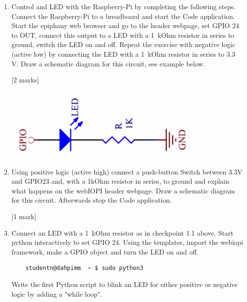 \begin{enumerate}
\item [1.1.] Control and LED with the Raspberry-Pi by completing the following steps. Connect the Raspberry-Pi to a breadboard and start the \webIOPi Code application.
Start the epiphany web browser and %
go to the \webIOPi header webpage, set GPIO 24 to OUT, connect this output to a LED with a 1~kOhm resistor in series to ground, switch the LED on and off.  Repeat the exercise with negative logic (active low) by connecting the LED with a 1~kOhm resistor in series to 3.3 V.  Draw a schematic diagram for this circuit, see example below.  

\hfill [2 marks]
 \vspace*{-8mm}
 \begin{center}                                        
 {\includegraphics[width=10cm]{figs/ActiveHighLED}}
 \end{center}
                                                            
 
\item [1.2.] Using positive logic (active high) connect a push-button Switch between 3.3V and GPIO23 and, with a 1kOhm resistor in series, to ground and explain what happens on the webIOPI header webpage. Draw a schematic diagram for this circuit. Afterwards stop the  \webIOPi Code application.
 
 \hfill [1 mark]\\
      

\item [1.3.]  Connect an LED with a 1~kOhm resistor as in checkpoint 1.1 above. Start python interactively to set GPIO 24.   Using the templates, import the webiopi framework, make a GPIO object and turn the LED on and off.
%
\begin{verbatim}
    studentn@dahpimm  ~ $ sudo python3
\end{verbatim}



Write the first Python script to blink an LED for either positive or negative logic 
by adding a "while loop".\\


\end{enumerate}
